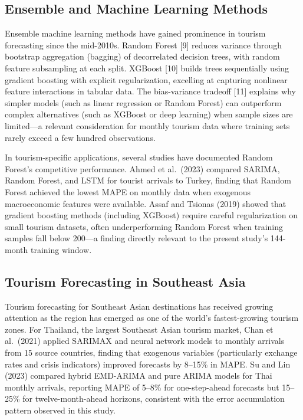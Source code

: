 \documentclass[
]{article}
\begin{document}
\subsection{Ensemble and Machine Learning
Methods}\label{ensemble-and-machine-learning-methods}

Ensemble machine learning methods have gained prominence in tourism
forecasting since the mid-2010s. Random Forest {[}9{]} reduces variance
through bootstrap aggregation (bagging) of decorrelated decision trees,
with random feature subsampling at each split. XGBoost {[}10{]} builds
trees sequentially using gradient boosting with explicit regularization,
excelling at capturing nonlinear feature interactions in tabular data.
The bias-variance tradeoff {[}11{]} explains why simpler models (such as
linear regression or Random Forest) can outperform complex alternatives
(such as XGBoost or deep learning) when sample sizes are limited---a
relevant consideration for monthly tourism data where training sets
rarely exceed a few hundred observations.

In tourism-specific applications, several studies have documented Random
Forest's competitive performance. Ahmed et al.~(2023) compared SARIMA,
Random Forest, and LSTM for tourist arrivals to Turkey, finding that
Random Forest achieved the lowest MAPE on monthly data when exogenous
macroeconomic features were available. Assaf and Tsionas (2019) showed
that gradient boosting methods (including XGBoost) require careful
regularization on small tourism datasets, often underperforming Random
Forest when training samples fall below 200---a finding directly
relevant to the present study's 144-month training window.

\subsection{Tourism Forecasting in Southeast
Asia}\label{tourism-forecasting-in-southeast-asia}

Tourism forecasting for Southeast Asian destinations has received
growing attention as the region has emerged as one of the world's
fastest-growing tourism zones. For Thailand, the largest Southeast Asian
tourism market, Chan et al.~(2021) applied SARIMAX and neural network
models to monthly arrivals from 15 source countries, finding that
exogenous variables (particularly exchange rates and crisis indicators)
improved forecasts by 8--15\% in MAPE. Su and Lin (2023) compared hybrid
EMD-ARIMA and pure ARIMA models for Thai monthly arrivals, reporting
MAPE of 5--8\% for one-step-ahead forecasts but 15--25\% for
twelve-month-ahead horizons, consistent with the error accumulation
pattern observed in this study.
\end{document}
